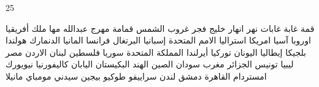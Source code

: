 \documentclass[twocolumn,a4paper]{article}
\begin{document}
25

\textarabic{ قمة  
 غابة  غابات
 نهر  انهار  
 خليج  
 فجر  
 غروب الشمس  
 قمامة  
 مهرج  
}\clearpage
\textarabic{
 عبدالله  
 مها  
 ملك  
}\clearpage
\textarabic{
 أفريقيا  
 اوروبا  
 آسيا  
 امريكا  
 استراليا  
 اﻻمم المتحدة  
 إسبانيا  
 البرتغال  
 فرانسا  
 المانيا  
  الدنمارك 
 هولندا  
 بلجيكا  
 إيطاليا  
 اليونان  
 توركيا  
 أيرلندا  
 المملكة المتحدة 
 سوريا  
 فلسطين  
 لبنان  
 الاردن  
 مصر  
 ليبيا  
 تونيس  
 الجزائر  
 مغرب  
 سودان  
 الصين  
 الهند  
 البكيستان  
 اليابان  
 كاليفورنيا  
 نيويورك  
 امستردام  
 القاهرة  
 دمشق  
 لندن  
 سراييفو  
 طوكيو  
 بيجين  
 سيدني  
 مومباي  
 مانيلا  
}
\end{document}
